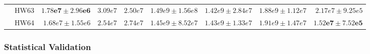 \documentclass[pdflatex]{sn-jnl}
\begin{document}
\begin{table}
\begin{tabular}{l|r|r|r|r|r|r|r|r}
& HW63 & $\mathbf{1.78e7 \pm 2.96e6}$ & $3.09e7$ & $2.50e7$
& $1.49e9 \pm 1.56e8$
& $1.42e9 \pm 2.84e7$
& $1.88e9 \pm 1.12e7$
& $2.17e7 \pm 9.25e5$ \\

& HW64 & $1.68e7 \pm 1.55e6$ & $2.54e7$ & $2.74e7$
& $1.45e9 \pm 8.52e7$
& $1.43e9 \pm 1.33e7$
& $1.91e9 \pm 1.47e7$
& $\mathbf{1.52e7 \pm 7.52e5}$ \\
\hline

\end{tabular}
\end{table}

\subsubsection{Statistical Validation}



\end{document}
